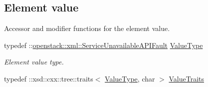 \subsection*{Element value}
\label{_amgrp2ee2eae1a8c390ea033f241c027da8d6}
Accessor and modifier functions for the element value. \begin{DoxyCompactItemize}
\item 
\hypertarget{classopenstack_1_1xml_1_1ServiceUnavailable_a73e1ad090ae99b97ab1773d1f7e94d80}{
typedef ::\hyperlink{classopenstack_1_1xml_1_1ServiceUnavailableAPIFault}{openstack::xml::ServiceUnavailableAPIFault} \hyperlink{classopenstack_1_1xml_1_1ServiceUnavailable_a73e1ad090ae99b97ab1773d1f7e94d80}{ValueType}}
\label{classopenstack_1_1xml_1_1ServiceUnavailable_a73e1ad090ae99b97ab1773d1f7e94d80}

\begin{DoxyCompactList}\small\item\em Element value type. \item\end{DoxyCompactList}\item 
\hypertarget{classopenstack_1_1xml_1_1ServiceUnavailable_a740d1e45bf0739b17fe5bbc9f4a95dad}{
typedef ::xsd::cxx::tree::traits$<$ \hyperlink{classopenstack_1_1xml_1_1ServiceUnavailableAPIFault}{ValueType}, char $>$ \hyperlink{classopenstack_1_1xml_1_1ServiceUnavailable_a740d1e45bf0739b17fe5bbc9f4a95dad}{ValueTraits}}
\label{classopenstack_1_1xml_1_1ServiceUnavailable_a740d1e45bf0739b17fe5bbc9f4a95dad}


\end{DoxyCompactItemize}

